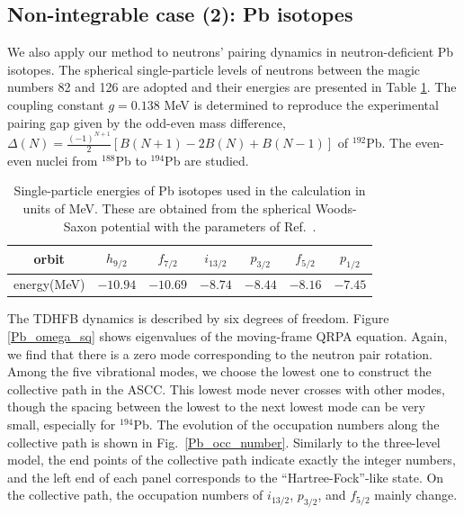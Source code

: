 \documentclass[11pt]{book} %
\begin{document}

\subsection{Non-integrable case (2): Pb isotopes}
\label{sec:Pb_isotopes}


We also apply our method to neutrons' pairing dynamics in 
neutron-deficient Pb isotopes.
The spherical single-particle levels of neutrons
between the magic numbers 82 and 126 are adopted and
their energies are presented in Table \ref{Pb}. 
The coupling constant $g=0.138$ MeV is determined to reproduce
the experimental pairing gap given by the odd-even mass difference,
$\Delta(N)=\frac{(-1)^{N+1}}{2}[B(N+1)-2B(N)+B(N-1)]$ of ${}^{192}$Pb.
The even-even nuclei from ${}^{188}$Pb to ${}^{194}$Pb
are studied.
\begin{table}[tb]
\begin{center}
\caption{Single-particle energies of Pb isotopes used in the calculation
in units of MeV.
These are obtained from the spherical Woods-Saxon potential
with the parameters of Ref.~\cite{BM69}.
}
\begin{tabular}{c|cccccc}
  \toprule 
  orbit& $h_{9/2}$ & $f_{7/2}$ & $i_{13/2}$ & $p_{3/2}$ & $f_{5/2}$ & $p_{1/2}$\\ \hline
  energy(MeV)& $-10.94$ & $-10.69$ & $-8.74$ & $-8.44$ & $-8.16$ & $-7.45$\\
  \bottomrule 
\end{tabular}
\label{Pb}
\end{center}
\end{table}

The TDHFB dynamics is described by six degrees of freedom.
Figure \ref{Pb_omega_sq} shows eigenvalues of the
moving-frame QRPA equation.
Again, we find that there is a zero mode corresponding to
the neutron pair rotation.
Among the five vibrational modes, we choose the lowest one to
construct the collective path in the ASCC.
This lowest mode never crosses with other modes,
though the spacing between the lowest to the next lowest mode
can be very small, especially for ${}^{194}$Pb.
The evolution of the occupation numbers along the collective path
is shown in Fig.~\ref{Pb_occ_number}.
Similarly to the three-level model, 
the end points of the collective path indicate exactly
the integer numbers, and
the left end of each panel corresponds to the
``Hartree-Fock''-like state.
On the collective path, the occupation numbers of $i_{13/2}$, $p_{3/2}$, and
$f_{5/2}$ mainly change.
\end{document}
